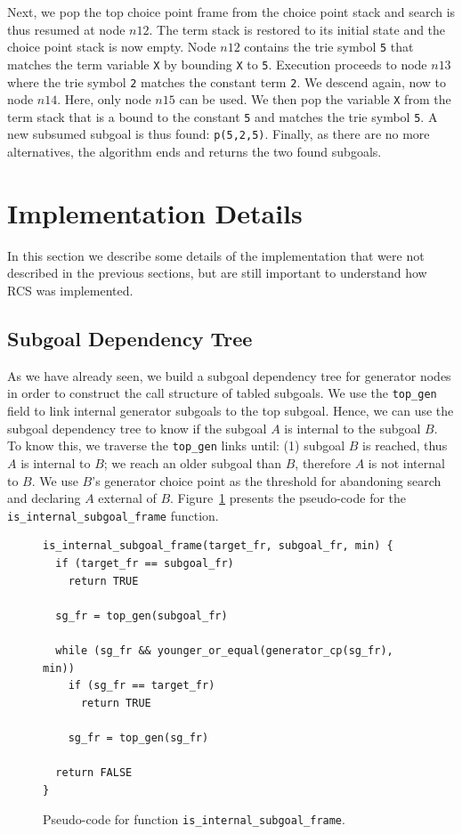 Next, we pop the top choice point frame from the choice point stack and search is thus resumed
at node $n12$. The term stack is restored to its initial state and the choice point stack is
now empty. Node $n12$ contains the trie symbol \texttt{5} that matches the term variable \texttt{X}
by bounding \texttt{X} to \texttt{5}. Execution proceeds to node $n13$ where the trie symbol
\texttt{2} matches the constant term \texttt{2}. We descend again, now to node $n14$. Here,
only node $n15$ can be used. We then pop the variable \texttt{X} from the term stack that is a
bound to the constant \texttt{5} and matches the trie symbol \texttt{5}. A new
subsumed subgoal is thus found: \texttt{p(5,2,5)}. Finally, as there are no more alternatives,
the algorithm ends and returns the two found subgoals. 

\section{Implementation Details}

In this section we describe some details of the implementation that were not described
in the previous sections, but are still important to understand how RCS was implemented.

\subsection{Subgoal Dependency Tree}

As we have already seen, we build a subgoal dependency tree for generator nodes
in order to construct the call structure of tabled subgoals. We use the \texttt{top\_gen}
field to link internal generator subgoals to the top subgoal.
Hence, we can use the subgoal dependency tree to know if the subgoal $A$ is internal
to the subgoal $B$. To know this, we traverse the \texttt{top\_gen} links until:
(1) subgoal $B$ is reached, thus $A$ is internal to $B$; we reach an older subgoal
than $B$, therefore $A$ is not internal to $B$. We use $B$'s generator choice point
as the threshold for abandoning search and declaring $A$ external of $B$.
Figure~\ref{fig:is_internal_subgoal_frame} presents the pseudo-code for the
\texttt{is\_internal\_subgoal\_frame} function.

\begin{figure}[ht]
\begin{Verbatim}
is_internal_subgoal_frame(target_fr, subgoal_fr, min) {
  if (target_fr == subgoal_fr)
    return TRUE
  
  sg_fr = top_gen(subgoal_fr)
  
  while (sg_fr && younger_or_equal(generator_cp(sg_fr), min))
    if (sg_fr == target_fr)
      return TRUE
    
    sg_fr = top_gen(sg_fr)
  
  return FALSE
}
\end{Verbatim}
\caption{Pseudo-code for function \texttt{is\_internal\_subgoal\_frame}.}
\label{fig:is_internal_subgoal_frame}
\end{figure}

